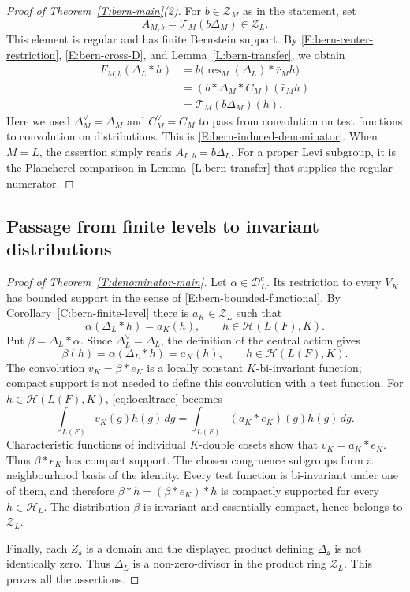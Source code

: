 \documentclass[11pt,a4paper]{amsart}
\newcommand{\mcH}{\mathcal H}
\newcommand{\mcD}{\mathcal D}
\newcommand{\mcZ}{\mathcal Z}
\theoremstyle{definition}
\theoremstyle{remark}
\newcommand{\grs}{\mathfrak s}
\begin{document}
\begin{proof}[Proof of Theorem~\ref{T:bern-main}(2)]
For $b\in\mcZ_M$ as in the statement, set
$$
 A_{M,b}=\mathcal T_M(b\Delta_M)\in\mcZ_L.
$$
This element is regular and has finite Bernstein support. By
\eqref{E:bern-center-restriction}, \eqref{E:bern-cross-D}, and
Lemma~\ref{L:bern-transfer}, we obtain
\begin{align*}
 F_{M,b}(\Delta_L* h)
 &=b\bigl(\operatorname{res}_M(\Delta_L)*\bar r_Mh\bigr)\\
 &=(b*\Delta_M*C_M)(\bar r_Mh)\\
 &=\mathcal T_M(b\Delta_M)(h).
\end{align*}
Here we used $\Delta_M^\vee=\Delta_M$ and $C_M^\vee=C_M$ to pass
from convolution on test functions to convolution on distributions.
This is \eqref{E:bern-induced-denominator}. When $M=L$, the assertion
simply reads $A_{L,b}=b\Delta_L$. For a proper Levi subgroup, it is
the Plancherel comparison in Lemma~\ref{L:bern-transfer} that supplies
the regular numerator.
\end{proof}

\subsection{Passage from finite levels to invariant distributions}
\begin{proof}[Proof of Theorem~\ref{T:denominator-main}]
Let $\alpha\in\mcD_L^c$. Its restriction to every $V_K$ has bounded
support in the sense of \eqref{E:bern-bounded-functional}.
By Corollary~\ref{C:bern-finite-level} there is $a_K\in\mcZ_L$ such that
\begin{equation}\label{eq:localtrace}
 \alpha(\Delta_L*h)=a_K(h),
 \qquad h\in\mcH(L(F),K).
\end{equation}
Put $\beta=\Delta_L*\alpha$. Since $\Delta_L^\vee=\Delta_L$, the
definition of the central action gives
$$
 \beta(h)=\alpha(\Delta_L*h)=a_K(h),
 \qquad h\in\mcH(L(F),K).
$$
The convolution $v_K=\beta*e_K$ is a locally constant $K$-bi-invariant
function; compact support is not needed to define this convolution
with a test function. For $h\in\mcH(L(F),K)$, \eqref{eq:localtrace} becomes
$$
 \int_{L(F)}v_K(g)h(g)\,dg
 =\int_{L(F)}(a_K*e_K)(g)h(g)\,dg.
$$
Characteristic functions of individual $K$-double cosets show that
$v_K=a_K*e_K$. Thus $\beta*e_K$ has compact support.
The chosen congruence subgroups form a neighbourhood basis of the
identity. Every test function is bi-invariant under one of them, and
therefore $\beta*h=(\beta*e_K)*h$ is compactly supported for every
$h\in\mcH_L$. The distribution $\beta$ is invariant and essentially
compact, hence belongs to $\mcZ_L$.

Finally, each $Z_{\grs}$ is a domain and the displayed product defining
$\Delta_{\grs}$ is not identically zero. Thus $\Delta_L$ is a
non-zero-divisor in the product ring $\mcZ_L$. This proves all the
assertions.
\end{proof}
\end{document}
